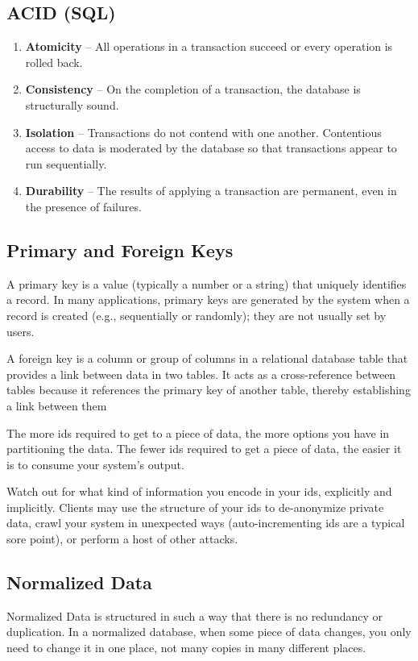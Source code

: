 \documentclass{article}
\begin{document}
\subsection{ACID (SQL)}
    \begin{enumerate}
        \item \textbf{Atomicity} -- All operations in a transaction succeed or every operation is rolled back.
        \item \textbf{Consistency} -- On the completion of a transaction, the database is structurally sound.
        \item \textbf{Isolation} -- Transactions do not contend with one another. Contentious access to data is moderated by the database so that transactions appear to run sequentially.
        \item \textbf{Durability} -- The results of applying a transaction are permanent, even in the presence of failures.
    \end{enumerate}
    
\subsection{Primary and Foreign Keys}
    A primary key is a value (typically a number or a string) that uniquely identifies a record. In many applications, primary keys are generated by the system when a record is created (e.g., sequentially or randomly); they are not usually set by users.
    
    A foreign key is a column or group of columns in a relational database table that provides a link between data in two tables. It acts as a cross-reference between tables because it references the primary key of another table, thereby establishing a link between them
    
    The more ids required to get to a piece of data, the more options you have in partitioning the data. The fewer ids required to get a piece of data, the easier it is to consume your system’s output.
    
    Watch out for what kind of information you encode in your ids, explicitly and implicitly. Clients may use the structure of your ids to de-anonymize private data, crawl your system in unexpected ways (auto-incrementing ids are a typical sore point), or perform a host of other attacks.
    
    
\subsection{Normalized Data}
    Normalized Data is structured in such a way that there is no redundancy or duplication. In a normalized database, when some piece of data changes, you only need to change it in one place, not many copies in many different places.
    
\end{document}
